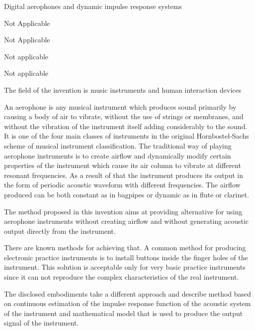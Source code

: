 



\pa
Digital aerophones and dynamic impulse response systems

Not Applicable

Not Applicable

Not applicable

Not applicable


\pa
The field of the invention is music instruments and human interaction devices

\pa
An aerophone is any musical instrument which produces sound primarily by causing a body of air to vibrate, without the use of strings or membranes, and without the vibration of the instrument itself adding considerably to the sound. It is one of the four main classes of instruments in the original Hornbostel-Sachs scheme of musical instrument classification. The traditional way of playing aerophone instruments is to create airflow and dynamically modify certain properties of the instrument which cause its air column to vibrate at different resonant frequencies. As a result of that the instrument produces its output in the form of periodic acoustic waveform with different frequencies. The airflow produced can be both constant as in bagpipes or dynamic as in flute or clarinet.

\pa
The method proposed in this invention aims at providing alternative for using aerophone instruments without creating airflow and without generating acoustic output directly from the instrument.

\pa
There are known methods for achieving that. A common method for producing electronic practice instruments is to install buttons inside the finger holes of the instrument. This solution is acceptable only for very basic practice instruments since it can not reproduce the complex characteristics of the real instrument.

\pa
The disclosed embodiments take a different approach and describe method based on continuous estimation of the impulse response function of the acoustic system of the instrument and mathematical model that is used to produce the output signal of the instrument.

